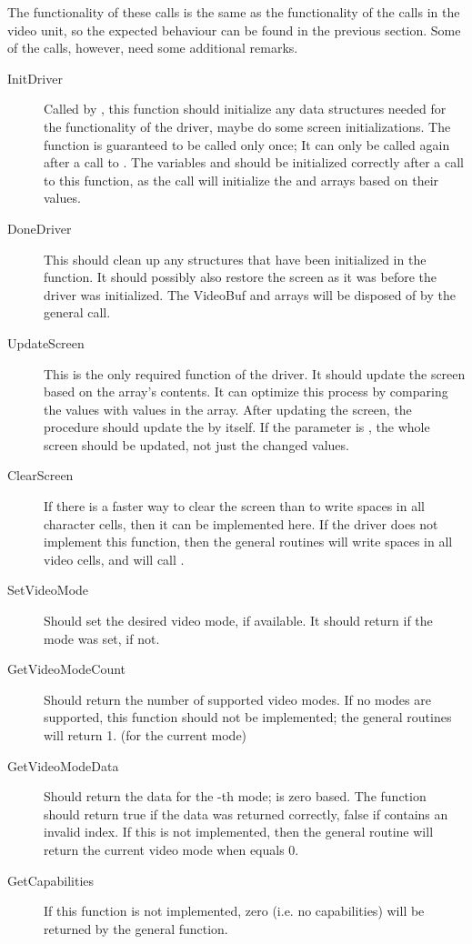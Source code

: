 The functionality of these calls is the same as the functionality of the
calls in the video unit, so the expected behaviour can be found in the
previous section. Some of the calls, however, need some additional remarks.
\begin{description}
\item[InitDriver] Called by , this function should initialize 
any data structures needed for the functionality of the driver, maybe do some 
screen initializations. The function is guaranteed to be called only once; It 
can only be called again after a call to . The variables
 and  should be initialized correctly
after a call to this function, as the  call will initialize
the  and  arrays based on their values.
\item[DoneDriver] This should clean up any structures that have been
initialized in the  function. It should possibly also
restore the screen as it was before the driver was initialized. The VideoBuf
and  arrays will be disposed of by the general 
call.
\item[UpdateScreen] This is the only required function of the driver. It
should update the screen based on the  array's contents. It
can optimize this process by comparing the values with values in the
 array. After updating the screen, the 
procedure should update the  by itself. If the 
parameter is , the whole screen should be updated, not just the
changed values.
\item[ClearScreen] If there is a faster way to clear the screen than to
write spaces in all character cells, then it can be implemented here. If the
driver does not implement this function, then the general routines will
write spaces in all video cells, and will call .
\item[SetVideoMode] Should set the desired video mode, if available. It
should return  if the mode was set,  if not.
\item[GetVideoModeCount] Should return the number of supported video modes.
If no modes are supported, this function should not be implemented; the
general routines will return 1. (for the current mode)
\item[GetVideoModeData] Should return the data for the -th mode;
 is zero based. The function should return true if the data was
returned correctly, false if  contains an invalid index.
If this is not implemented, then the general routine will return the current 
video mode when  equals 0.
\item[GetCapabilities] If this function is not implemented, zero (i.e.
no capabilities) will be returned by the general function.
\end{description}

